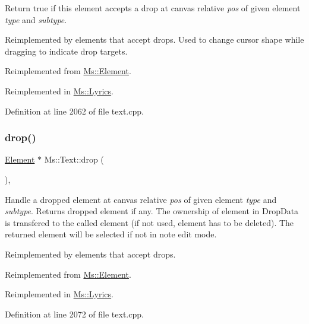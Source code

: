 Return true if this element accepts a drop at canvas relative {\itshape pos} of given element {\itshape type} and {\itshape subtype}.

Reimplemented by elements that accept drops. Used to change cursor shape while dragging to indicate drop targets. 

Reimplemented from \hyperlink{class_ms_1_1_element_a35614445f0bc2212cbcc75c3f5810543}{Ms\+::\+Element}.



Reimplemented in \hyperlink{class_ms_1_1_lyrics_ac43270be909641564ad6ded9af47cafa}{Ms\+::\+Lyrics}.



Definition at line 2062 of file text.\+cpp.

\mbox{\label{class_ms_1_1_text_a410338a533177c7f52bbd691505211a0}} 
\subsubsection{\texorpdfstring{drop()}{drop()}}
{\footnotesize\ttfamily \hyperlink{class_ms_1_1_element}{Element} $\ast$ Ms\+::\+Text\+::drop (\begin{DoxyParamCaption}\item[{\hyperlink{class_ms_1_1_edit_data}{Edit\+Data} \&}]{ }\end{DoxyParamCaption})\hspace{0.3cm}{\ttfamily [override]}, {\ttfamily [virtual]}}

Handle a dropped element at canvas relative {\itshape pos} of given element {\itshape type} and {\itshape subtype}. Returns dropped element if any. The ownership of element in Drop\+Data is transfered to the called element (if not used, element has to be deleted). The returned element will be selected if not in note edit mode.

Reimplemented by elements that accept drops. 

Reimplemented from \hyperlink{class_ms_1_1_element_a0ca69a9fb48e7b9fb481aacaf3860032}{Ms\+::\+Element}.



Reimplemented in \hyperlink{class_ms_1_1_lyrics_acbb976663d84ab3abf82d0609574b26f}{Ms\+::\+Lyrics}.



Definition at line 2072 of file text.\+cpp.


